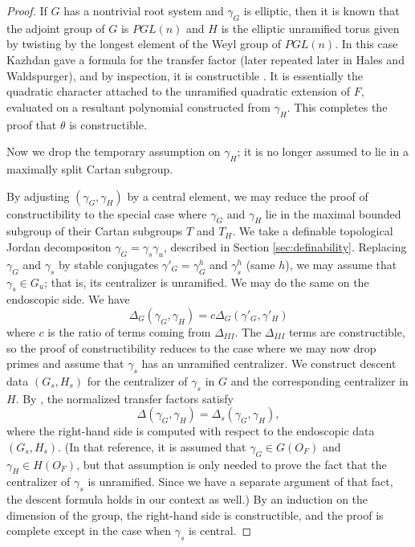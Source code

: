 \begin{proof}
If $G$ has a nontrivial root system and $\gamma_G$ is elliptic, then it is known that the adjoint group of $G$ is $PGL(n)$ and $H$ is the elliptic
unramified torus given by twisting by the longest element of the Weyl group of $PGL(n)$.  In this case Kazhdan gave a formula for the transfer factor 
(later repeated later in Hales and Waldspurger), and by inspection, it is constructible \cite{kazhdan1983lifting}.  It is essentially the
quadratic character attached to the unramified quadratic extension of $F$,
evaluated on a resultant polynomial constructed from $\gamma_H$.   This completes the proof that $\theta$ is constructible.

Now we drop the temporary assumption on $\gamma_H$; it is no longer assumed to lie in a maximally split Cartan subgroup.


By adjusting $(\gamma_G,\gamma_H)$ by a central element, we may reduce the proof of constructibility to the special case  where $\gamma_G$ and
$\gamma_H$ lie in the maximal bounded subgroup of their Cartan subgroups $T$ and $T_H$.
We take a definable topological Jordan decompositon $\gamma_G = \gamma_s \gamma_u$, described in Section \ref{sec:definability}.
Replacing $\gamma_G$ and $\gamma_s$ by stable conjugates $\gamma'_G=\gamma_G^h$ and $\gamma_s^h$ (same $h$), we may assume that
$\gamma_s\in G_u$; that is, its centralizer is unramified.  We may do the same on the endoscopic side.  We have 
\[
\Delta_G(\gamma_G,\gamma_H) = c \Delta_G(\gamma'_G,\gamma'_H)
\]
where $c$ is the ratio of terms coming from $\Delta_{III}$.  The $\Delta_{III}$ terms are constructible, so the proof of constructibility reduces to
the case where we may now drop primes and assume that $\gamma_s$ has an unramified centralizer.
We construct descent data $(G_s,H_s)$ for the centralizer of $\gamma_s$ in $G$ and the corresponding centralizer in $H$.
By \cite{hales1993simple}, the normalized transfer factors satisfy
\[
\Delta(\gamma_G,\gamma_H) = \Delta_s(\gamma_G,\gamma_H),
\]
where the right-hand side is computed with respect to the endoscopic data $(G_s,H_s)$.
(In that reference, it is assumed that $\gamma_G\in G(O_F)$ and $\gamma_H\in H(O_F)$, but that assumption is only needed 
to prove the fact that the centralizer of $\gamma_s$ is unramified.  Since we have a separate argument of that fact, the descent formula
holds in our context as well.)
By an induction on the dimension of the group, the right-hand side is constructible, and the proof is complete except in the case
when $\gamma_s$ is central.


\end{proof}

